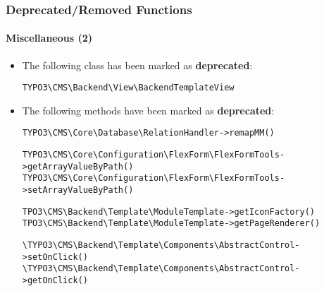 %

\begin{frame}[fragile]
	\frametitle{Deprecated/Removed Functions}
	\framesubtitle{Miscellaneous (2)}


	\begin{itemize}
		\item The following class has been marked as \textbf{deprecated}:
\begin{lstlisting}
TYPO3\CMS\Backend\View\BackendTemplateView
\end{lstlisting}
		\item The following methods have been marked as \textbf{deprecated}:
\begin{lstlisting}
TYPO3\CMS\Core\Database\RelationHandler->remapMM()
\end{lstlisting}
\vspace{-0.2cm}
\begin{lstlisting}
TYPO3\CMS\Core\Configuration\FlexForm\FlexFormTools->getArrayValueByPath()
TYPO3\CMS\Core\Configuration\FlexForm\FlexFormTools->setArrayValueByPath()
\end{lstlisting}
\vspace{-0.2cm}
\begin{lstlisting}
TPO3\CMS\Backend\Template\ModuleTemplate->getIconFactory()
TPO3\CMS\Backend\Template\ModuleTemplate->getPageRenderer()
\end{lstlisting}
\vspace{-0.2cm}
\begin{lstlisting}
\TYPO3\CMS\Backend\Template\Components\AbstractControl->setOnClick()
\TYPO3\CMS\Backend\Template\Components\AbstractControl->getOnClick()
\end{lstlisting}
	\end{itemize}

\end{frame}

